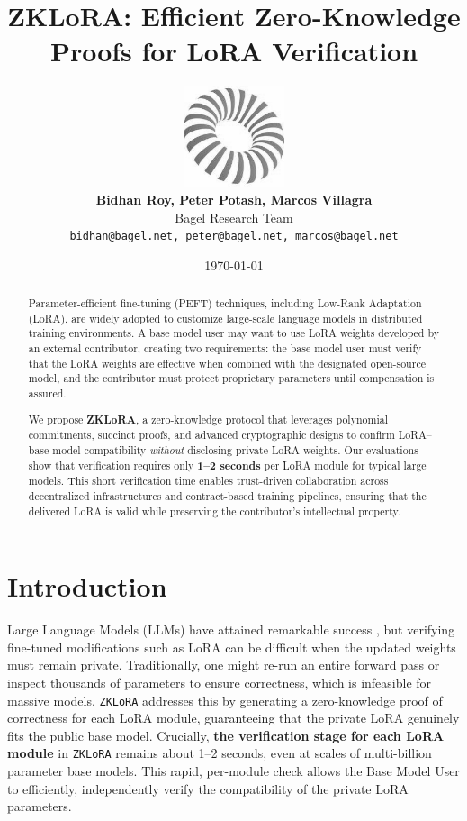 \documentclass[11pt]{article}
\title{\textbf{ZKLoRA: Efficient Zero-Knowledge Proofs for LoRA Verification}}
\author{ \includegraphics[height=8em]{figs/bagel-logo-bw.png} \\
    \textbf{Bidhan Roy, Peter Potash, Marcos Villagra} \\
    Bagel Research Team\footnotemark[1] \\
    \texttt{bidhan@bagel.net, peter@bagel.net, marcos@bagel.net}
}
\date{\today}
\begin{document}
\maketitle


\begin{abstract}
    Parameter-efficient fine-tuning (PEFT) techniques, including Low-Rank Adaptation (LoRA), are widely adopted to customize large-scale language models in distributed training environments. A base model user may want to use LoRA weights developed by an external contributor, creating two requirements: the base model user must verify that the LoRA weights are effective when combined with the designated open-source model, and the contributor must protect proprietary parameters until compensation is assured.
    
    We propose \textbf{ZKLoRA}, a zero-knowledge protocol that leverages polynomial commitments, succinct proofs, and advanced cryptographic designs to confirm LoRA–base model compatibility \emph{without} disclosing private LoRA weights. Our evaluations show that verification requires only \textbf{1--2 seconds} per LoRA module for typical large models. This short verification time enables trust-driven collaboration across decentralized infrastructures and contract-based training pipelines, ensuring that the delivered LoRA is valid while preserving the contributor’s intellectual property.
\end{abstract}

\section{Introduction}
Large Language Models (LLMs) have attained remarkable success \cite{brown2020language, devlin2018bert}, but verifying fine-tuned modifications such as LoRA \cite{hu2021lora} can be difficult when the updated weights must remain private. 
Traditionally, one might re-run an entire forward pass or inspect thousands of parameters to ensure correctness, which is infeasible for massive models. 
\texttt{ZKLoRA} addresses this by generating a zero-knowledge proof of correctness for each LoRA module, guaranteeing that the private LoRA genuinely fits the public base model. 
Crucially, \textbf{the verification stage for each LoRA module} in \texttt{ZKLoRA} remains about 1--2 seconds, even at scales of multi-billion parameter base models. 
This rapid, per-module check allows the Base Model User to efficiently, independently verify the compatibility of the private LoRA parameters.
\end{document}
